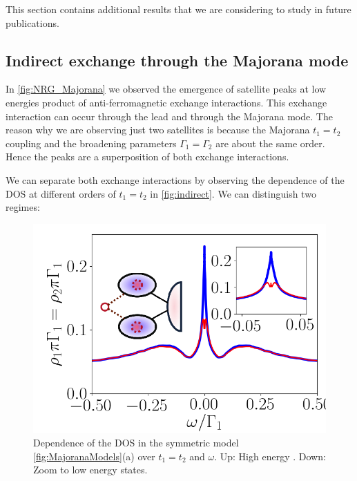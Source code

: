 This section contains additional results that we are considering to study in  future publications. 

\subsection{Indirect exchange through the Majorana mode}

In \ref{fig:NRG_Majorana} we observed the emergence of satellite peaks at low energies product of anti-ferromagnetic exchange interactions. This exchange interaction can occur through the lead and through the Majorana mode. The reason why we are observing just two satellites is because the Majorana $t_1=t_2$ coupling and the broadening parameters $\Gamma_1 = \Gamma_2$ are about the same order. Hence the peaks are a superposition of both exchange interactions. 

We can separate both exchange interactions by observing the dependence of the DOS at different orders of $t_1=t_2$ in \ref{fig:indirect}. We can distinguish two regimes:

\begin{figure}[t]
\centering
\includegraphics[scale=0.4]{IMAGES/NRG/Lowt1=t2.png}
\caption{ \label{fig:indirectLow} Dependence of the DOS in the symmetric model \ref{fig:MajoranaModels}(a) over $t_1=t_2$ and $\omega$. Up: High energy . Down: Zoom to low energy states.  \protect{}}
\end{figure}

